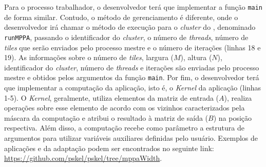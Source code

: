 Para o processo trabalhador, o desenvolvedor terá que implementar a função \texttt{main}
de forma similar. Contudo, o método de gerenciamento é diferente, onde
o desenvolvedor irá chamar o método de execução para o \textit{cluster} do \mppa,
denominado \texttt{runMPPA}, passando o identificador do \textit{cluster}, o número de \textit{threads},
número de \textit{tiles} que serão enviados pelo processo mestre e o número de iterações
(linhas 18 e 19). As informações sobre o número de \textit{tiles}, largura ($M$),
altura ($N$), identificador do \textit{cluster}, número de \textit{threads} e
iterações são enviadas pelo processo mestre e obtidos pelos argumentos
da função \texttt{main}. Por fim, o desenvolvedor terá que implementar a computação da aplicação, isto é,
o \textit{Kernel} \stencil da aplicação (linhas 1-5). O \textit{Kernel}, geralmente, utiliza
elementos da matriz de entrada ($A$), realiza operações sobre esse elemento de
acordo com os vizinhos caracterizados pela máscara da computação e atribui o
resultado à matriz de saída ($B$) na posição respectiva. Além disso, a computação
recebe como parâmetro a estrutura de argumentos para utilizar variáveis
auxiliares definidas pelo usuário. Exemplos de aplicações e da
adaptação podem ser encontrados no seguinte link:
\url{https://github.com/pskel/pskel/tree/mppaWidth}.






